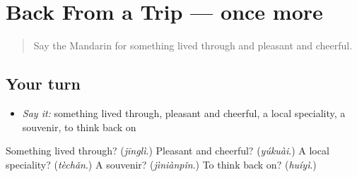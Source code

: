 \section[(dialogue)]{Back From a Trip — once more}

\label{lesson:ZH-R247-review-final-247}



\begin{quote}
Say the Mandarin for something lived through and pleasant and cheerful.
\end{quote}

\subsection*{Your turn}
\begin{itemize}
\raggedright
  \item \emph{Say it:} something lived through, pleasant and cheerful, a local speciality, a souvenir, to think back on
\end{itemize}

\begin{tcolorbox}[breakable,colback=teal!4,colframe=teal!35!black,title={Before you move on}]
Something lived through? (\emph{jīnglì}.) Pleasant and cheerful? (\emph{yúkuài}.) A local speciality? (\emph{tèchǎn}.) A souvenir? (\emph{jìniànpǐn}.) To think back on? (\emph{huíyì}.)
\end{tcolorbox}
